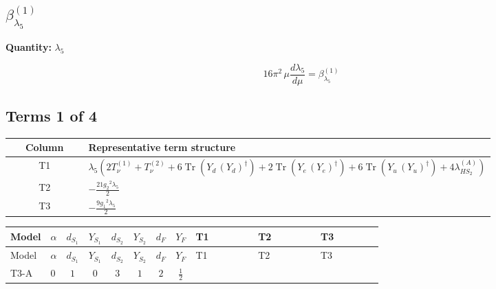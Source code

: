 \documentclass[8pt]{article}
\begin{document}
\begin{landscape}
\section*{$\beta_{\lambda_5}^{(1)}$}
\noindent\textbf{Quantity: }$\lambda_5$\par\smallskip
\[16\pi^2\,\mu\frac{d \lambda_5}{d\mu}=\beta_{\lambda_5}^{(1)}\]
\subsection*{Terms 1 of 4}
\begin{center}
\begin{tabular}{@{}c >{\raggedright\arraybackslash}p{0.82\linewidth}@{}}
\toprule
Column & Representative term structure \\
\midrule
T1 & \(\displaystyle {\lambda_5} (2 T_{\nu}^{(1)}+T_{\nu}^{(2)}+6 \operatorname{Tr}\!\left({Y_d}\,\left({Y_d}\right)^{\dagger}\right)+2 \operatorname{Tr}\!\left({Y_e}\,\left({Y_e}\right)^{\dagger}\right)+6 \operatorname{Tr}\!\left({Y_u}\,\left({Y_u}\right)^{\dagger}\right)+4 {\lambda_{HS_2}^{(A)}})\) \\
\midrule
T2 & \(\displaystyle -\frac{21 {g_2}^2 {\lambda_5}}{2}\) \\
\midrule
T3 & \(\displaystyle -\frac{9 {g_1}^2 {\lambda_5}}{2}\) \\
\midrule
\bottomrule
\end{tabular}
\end{center}
\smallskip
\tiny
\begin{longtable}{@{}llcccccc >{\raggedright\arraybackslash}p{0.21\linewidth} >{\raggedright\arraybackslash}p{0.21\linewidth} >{\raggedright\arraybackslash}p{0.21\linewidth}@{}}
\toprule
Model & $\alpha$ & $d_{S_1}$ & $Y_{S_1}$ & $d_{S_2}$ & $Y_{S_2}$ & $d_F$ & $Y_F$ & T1 & T2 & T3 \\
\midrule
\endfirsthead
\toprule
Model & $\alpha$ & $d_{S_1}$ & $Y_{S_1}$ & $d_{S_2}$ & $Y_{S_2}$ & $d_F$ & $Y_F$ & T1 & T2 & T3 \\
\midrule
\endhead
T3-A & $0$ & $1$ & $0$ & $3$ & $1$ & $2$ & $\frac{1}{2}$ & \scriptsize\adjustbox{max width=\linewidth}{$\begin{gathered} {\lambda_5} (2 T_{\nu}^{(1)}+T_{\nu}^{(2)}+6 \operatorname{Tr}\!\left({Y_d}\,\left({Y_d}\right)^{\dagger}\right)+2 \operatorname{Tr}\!\left({Y_e}\,\left({Y_e}\right)^{\dagger}\right)+6 \operatorname{Tr}\!\left({Y_u}\,\left({Y_u}\right)^{\dagger}\right)+4 {\lambda_{HS_2}^{(A)}})\end{gathered}$} & \scriptsize\adjustbox{max width=\linewidth}{$\begin{gathered} -\frac{21 {g_2}^2 {\lambda_5}}{2}\end{gathered}$} & \scriptsize\adjustbox{max width=\linewidth}{$\begin{gathered} -\frac{9 {g_1}^2 {\lambda_5}}{2}\end{gathered}$} \\

\end{longtable}
\end{landscape}
\end{document}

